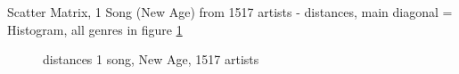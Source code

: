 \noindent Scatter Matrix, 1 Song (New Age) from 1517 artists - distances, main diagonal = Histogram, all genres in figure \ref{fig:corr4}
\begin{figure}[htbp]
	\centering
	\caption{distances 1 song, New Age, 1517 artists}
	\label{fig:corr4}
\end{figure}
\FloatBarrier

